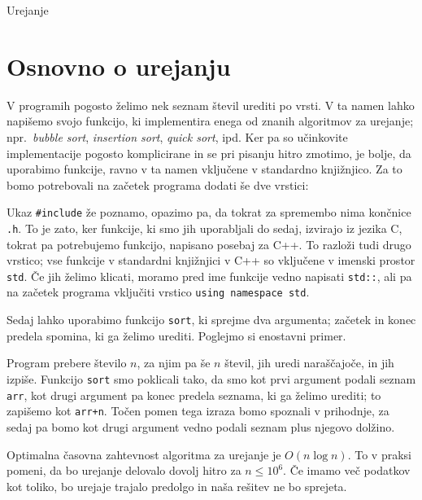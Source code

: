 
Urejanje


\section{Osnovno o urejanju}

V programih pogosto želimo nek seznam števil urediti po vrsti.
V ta namen lahko napišemo svojo funkcijo, ki implementira enega od znanih
algoritmov za urejanje; npr.~\textit{bubble sort}, \textit{insertion sort},
\textit{quick sort}, ipd. Ker pa so učinkovite implementacije pogosto komplicirane
in se pri pisanju hitro zmotimo, je bolje, da uporabimo funkcije, ravno v ta
namen vključene v standardno knjižnjico. Za to bomo potrebovali na začetek
programa dodati še dve vrstici:


Ukaz \verb+#include+ že poznamo, opazimo pa, da tokrat za spremembo nima končnice
\verb+.h+. To je zato, ker funkcije, ki smo jih uporabljali do sedaj, izvirajo
iz jezika C, tokrat pa potrebujemo funkcijo, napisano posebaj za C++. To razloži
tudi drugo vrstico; vse funkcije v standardni knjižnjici v C++ so vključene
v imenski prostor \verb+std+. Če jih želimo klicati, moramo pred ime funkcije
vedno napisati \verb+std::+, ali pa na začetek programa vključiti vrstico
\verb+using namespace std+.

Sedaj lahko uporabimo funkcijo \verb+sort+, ki sprejme dva argumenta;
začetek in konec predela spomina, ki ga želimo urediti. Poglejmo si enostavni
primer.



Program prebere število \(n\), za njim pa še \(n\) števil, jih uredi naraščajoče,
in jih izpiše. Funkcijo \verb+sort+ smo poklicali tako, da smo kot prvi argument
podali seznam \verb+arr+, kot drugi argument pa konec predela seznama, ki ga
želimo urediti; to zapišemo kot \verb|arr+n|. Točen pomen tega izraza bomo
spoznali v prihodnje, za sedaj pa bomo kot drugi argument vedno podali seznam
plus njegovo dolžino.

Optimalna časovna zahtevnost algoritma za urejanje je \(O(n \log n)\). To v praksi
pomeni, da bo urejanje delovalo dovolj hitro za \(n \le 10^6\). Če imamo več
podatkov kot toliko, bo urejaje trajalo predolgo in naša rešitev ne bo sprejeta.

